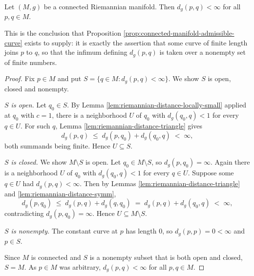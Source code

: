 \begin{proposition}
\label{prop:riemannian-distance-finite}
\leanok
{}
Let $(M,g)$ be a connected Riemannian manifold. Then $d_g(p,q) < \infty$ for all
$p, q \in M$.

This is the conclusion that Proposition \ref{prop:connected-manifold-admissible-curve}
exists to supply: it is exactly the assertion that some curve of finite length joins
$p$ to $q$, so that the infimum defining $d_g(p,q)$ is taken over a nonempty set of
finite numbers.
\end{proposition}

\begin{proof}
\leanok
{}
Fix $p \in M$ and put $S = \{q \in M : d_g(p,q) < \infty\}$. We show $S$ is open, closed
and nonempty.

\emph{$S$ is open.} Let $q_0 \in S$. By Lemma \ref{lem:riemannian-distance-locally-small}
applied at $q_0$ with $c = 1$, there is a neighborhood $U$ of $q_0$ with $d_g(q_0, q) < 1$
for every $q \in U$. For such $q$, Lemma \ref{lem:riemannian-distance-triangle} gives
\[
  d_g(p,q) \;\le\; d_g(p,q_0) + d_g(q_0,q) \;<\; \infty,
\]
both summands being finite. Hence $U \subseteq S$.

\emph{$S$ is closed.} We show $M \setminus S$ is open. Let $q_0 \in M \setminus S$, so
$d_g(p,q_0) = \infty$. Again there is a neighborhood $U$ of $q_0$ with $d_g(q_0,q) < 1$
for every $q \in U$. Suppose some $q \in U$ had $d_g(p,q) < \infty$. Then by
Lemmas \ref{lem:riemannian-distance-triangle} and \ref{lem:riemannian-distance-symm},
\[
  d_g(p,q_0) \;\le\; d_g(p,q) + d_g(q,q_0) \;=\; d_g(p,q) + d_g(q_0,q) \;<\; \infty,
\]
contradicting $d_g(p,q_0) = \infty$. Hence $U \subseteq M \setminus S$.

\emph{$S$ is nonempty.} The constant curve at $p$ has length $0$, so $d_g(p,p) = 0 < \infty$
and $p \in S$.

Since $M$ is connected and $S$ is a nonempty subset that is both open and closed, $S = M$.
As $p \in M$ was arbitrary, $d_g(p,q) < \infty$ for all $p, q \in M$.
\end{proof}


